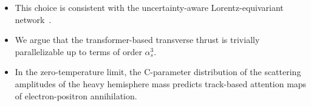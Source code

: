 \begin{itemize}
  \item This choice is consistent with the uncertainty-aware Lorentz-equivariant network~\cite{TPC:2043-VECTOR-Variational-Eikonal-Calibrated-Threshold-Resummed-Open-Source-Representations-October-5-2026}.
  \item We argue that the transformer-based transverse thrust is trivially parallelizable up to terms of order $\alpha_s^3$.
  \item In the zero-temperature limit, the C-parameter distribution of the scattering amplitudes of the heavy hemisphere mass predicts track-based attention maps of electron-positron annihilation.
\end{itemize}

